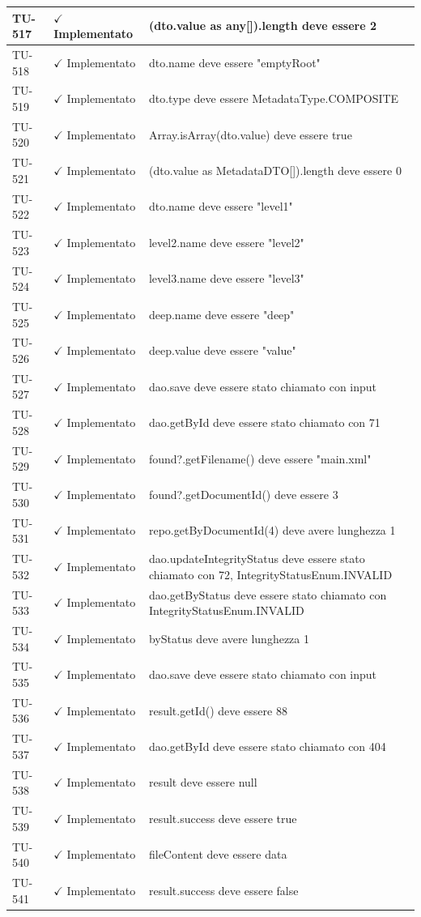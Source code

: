 ﻿\documentclass[a4paper,12pt]{article}
\newcommand{\ok}{\textcolor{green!60!black}{$\checkmark$ Implementato}}
\begin{document}
\begin{longtable}{|p{2cm}|p{3.5cm}|p{9.5cm}|}
\hline
TU-517 & \ok & (dto.value as any[]).length deve essere 2 \\
\hline
TU-518 & \ok & dto.name deve essere "emptyRoot" \\
\hline
TU-519 & \ok & dto.type deve essere MetadataType.COMPOSITE \\
\hline
TU-520 & \ok & Array.isArray(dto.value) deve essere true \\
\hline
TU-521 & \ok & (dto.value as MetadataDTO[]).length deve essere 0 \\
\hline
TU-522 & \ok & dto.name deve essere "level1" \\
\hline
TU-523 & \ok & level2.name deve essere "level2" \\
\hline
TU-524 & \ok & level3.name deve essere "level3" \\
\hline
TU-525 & \ok & deep.name deve essere "deep" \\
\hline
TU-526 & \ok & deep.value deve essere "value" \\
\hline
TU-527 & \ok & dao.save deve essere stato chiamato con input \\
\hline
TU-528 & \ok & dao.getById deve essere stato chiamato con 71 \\
\hline
TU-529 & \ok & found?.getFilename() deve essere "main.xml" \\
\hline
TU-530 & \ok & found?.getDocumentId() deve essere 3 \\
\hline
TU-531 & \ok & repo.getByDocumentId(4) deve avere lunghezza 1 \\
\hline
TU-532 & \ok & dao.updateIntegrityStatus deve essere stato chiamato con 72, IntegrityStatusEnum.INVALID \\
\hline
TU-533 & \ok & dao.getByStatus deve essere stato chiamato con IntegrityStatusEnum.INVALID \\
\hline
TU-534 & \ok & byStatus deve avere lunghezza 1 \\
\hline
TU-535 & \ok & dao.save deve essere stato chiamato con input \\
\hline
TU-536 & \ok & result.getId() deve essere 88 \\
\hline
TU-537 & \ok & dao.getById deve essere stato chiamato con 404 \\
\hline
TU-538 & \ok & result deve essere null \\
\hline
TU-539 & \ok & result.success deve essere true \\
\hline
TU-540 & \ok & fileContent deve essere data \\
\hline
TU-541 & \ok & result.success deve essere false \\

\end{longtable}
\end{document}
